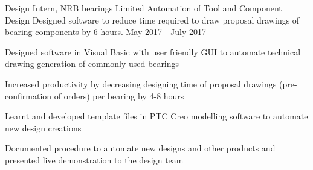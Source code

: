 

\begin{cventries}
	\cventry
		{Design Intern, NRB bearings Limited}
		{Automation of Tool and Component Design}
		{Designed software to reduce time required to draw proposal drawings of bearing components by 6 hours.}
		{May 2017 - July 2017}
		{
		\begin{cvitems}
			\item Designed software in Visual Basic with user friendly GUI to automate technical drawing generation of commonly used bearings
			\item Increased productivity by decreasing designing time of proposal drawings (pre-confirmation of orders) per bearing by 4-8 hours
			\item Learnt and developed template files in PTC Creo modelling software to automate new design creations
			\item Documented procedure to automate new designs and other products and presented live demonstration to the design team 
		\end{cvitems}
		}
\end{cventries}